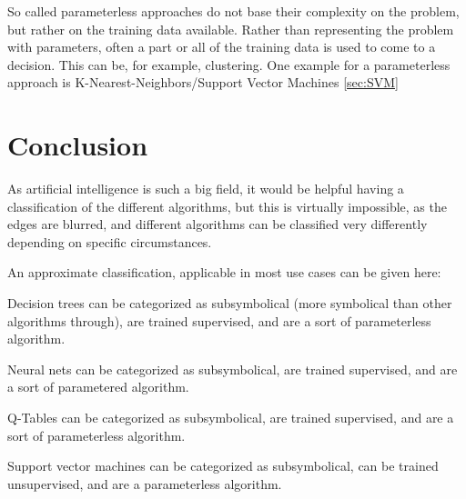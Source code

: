 So called parameterless approaches do not base their complexity on the problem, but rather on the training data available. Rather than representing the problem with parameters, often a part or all of the training data is used to come to a decision. This can be, for example, clustering.
One example for a parameterless approach is K-Nearest-Neighbors/Support Vector Machines \autoref{sec:SVM}

\chapter{Conclusion}
As artificial intelligence is such a big field, it would be helpful having a classification of the different algorithms, but this is virtually impossible, as the edges are blurred, and different algorithms can be classified very differently depending on specific circumstances.

An approximate classification, applicable in most use cases can be given here:

Decision trees can be categorized as subsymbolical (more symbolical than other algorithms through), are trained supervised, and are a sort of parameterless algorithm.

Neural nets can be categorized as subsymbolical, are trained supervised, and are a sort of parametered algorithm.

Q-Tables can be categorized as subsymbolical, are trained supervised, and are a sort of parameterless algorithm.

Support vector machines can be categorized as subsymbolical, can be trained unsupervised, and are a parameterless algorithm.







